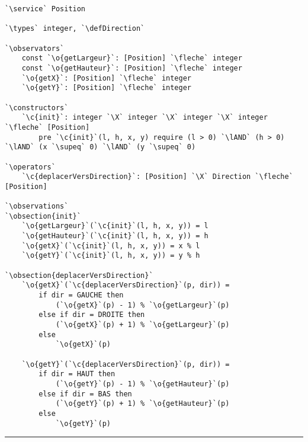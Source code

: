 \documentclass{article}
\newcommand{\fleche}{$\rightarrow{}$}
\newcommand{\X}{$\times{}$}
\newcommand{\supeq}{$\geq$~}
\newcommand{\lAND}{$\land$}
\newcommand{\specsec}[1]{\normalfont{\Large{\textbf{#1:}}}}
\newcommand{\service}{\specsec {Service}}
\newcommand{\types}{\specsec {Types}}
\newcommand{\observators}{\specsec {Observators}}
\newcommand{\constructors}{\specsec {Constructors}}
\newcommand{\operators}{\specsec {Operators}}
\newcommand{\observations}{\specsec {Observations}}
\newcommand{\obsection}[1]{\textbf{[#1]}}
\newcommand{\Direction}{Direction}
\newcommand{\defDirection}{\mbox{enum \Direction}~\{~HAUT, BAS, GAUCHE, DROITE~\}}
\renewcommand{\o}[1]{\textcolor{blue}{#1}}
\renewcommand{\c}[1]{\textcolor{red}{#1}}
\begin{document}
\begin{lstlisting}[caption=Position]
`\service` Position

`\types` integer, `\defDirection`

`\observators`
	const `\o{getLargeur}`: [Position] `\fleche` integer
	const `\o{getHauteur}`: [Position] `\fleche` integer
	`\o{getX}`: [Position] `\fleche` integer
	`\o{getY}`: [Position] `\fleche` integer
	
`\constructors`
	`\c{init}`: integer `\X` integer `\X` integer `\X` integer `\fleche` [Position]
		pre `\c{init}`(l, h, x, y) require (l > 0) `\lAND` (h > 0) `\lAND` (x `\supeq` 0) `\lAND` (y `\supeq` 0)

`\operators`
	`\c{deplacerVersDirection}`: [Position] `\X` Direction `\fleche` [Position]
	
`\observations`
`\obsection{init}`
	`\o{getLargeur}`(`\c{init}`(l, h, x, y)) = l
	`\o{getHauteur}`(`\c{init}`(l, h, x, y)) = h
	`\o{getX}`(`\c{init}`(l, h, x, y)) = x % l
	`\o{getY}`(`\c{init}`(l, h, x, y)) = y % h

`\obsection{deplacerVersDirection}`
	`\o{getX}`(`\c{deplacerVersDirection}`(p, dir)) =
		if dir = GAUCHE then
			(`\o{getX}`(p) - 1) % `\o{getLargeur}`(p)
		else if dir = DROITE then
			(`\o{getX}`(p) + 1) % `\o{getLargeur}`(p)
		else
			`\o{getX}`(p)
			
	`\o{getY}`(`\c{deplacerVersDirection}`(p, dir)) =
		if dir = HAUT then
			(`\o{getY}`(p) - 1) % `\o{getHauteur}`(p)
		else if dir = BAS then
			(`\o{getY}`(p) + 1) % `\o{getHauteur}`(p)
		else
			`\o{getY}`(p)
\end{lstlisting}

\hrule
\clearpage{}
\end{document}
